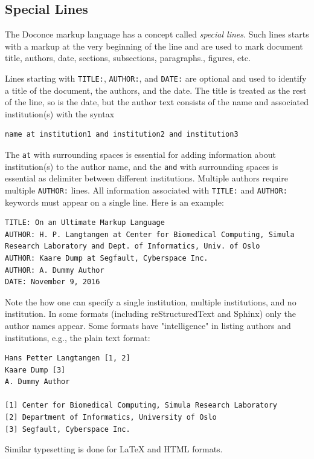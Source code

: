 \documentclass{article}
\begin{document}
\noindent

\subsection{Special Lines}

The Doconce markup language has a concept called \emph{special lines}.
Such lines starts with a markup at the very beginning of the
line and are used to mark document title, authors, date,
sections, subsections, paragraphs., figures, etc.

  

Lines starting with {\fontsize{10pt}{10pt}\verb!TITLE:!}, {\fontsize{10pt}{10pt}\verb!AUTHOR:!}, and {\fontsize{10pt}{10pt}\verb!DATE:!} are optional and used
to identify a title of the document, the authors, and the date. The
title is treated as the rest of the line, so is the date, but the
author text consists of the name and associated institution(s) with
the syntax 
\begin{Verbatim}[fontsize=\fontsize{9pt}{9pt},tabsize=8,baselinestretch=0.85,
fontfamily=tt,xleftmargin=7mm]
name at institution1 and institution2 and institution3
\end{Verbatim}
\noindent
The {\fontsize{10pt}{10pt}\verb!at!} with surrounding spaces
is essential for adding information about institution(s)
to the author name, and the {\fontsize{10pt}{10pt}\verb!and!} with surrounding spaces is
essential as delimiter between different institutions.
Multiple authors require multiple {\fontsize{10pt}{10pt}\verb!AUTHOR:!} lines. All information
associated with {\fontsize{10pt}{10pt}\verb!TITLE:!} and {\fontsize{10pt}{10pt}\verb!AUTHOR:!} keywords must appear on a single
line.  Here is an example:
\begin{Verbatim}[fontsize=\fontsize{9pt}{9pt},tabsize=8,baselinestretch=0.85,
fontfamily=tt,xleftmargin=7mm]
TITLE: On an Ultimate Markup Language
AUTHOR: H. P. Langtangen at Center for Biomedical Computing, Simula Research Laboratory and Dept. of Informatics, Univ. of Oslo
AUTHOR: Kaare Dump at Segfault, Cyberspace Inc.
AUTHOR: A. Dummy Author
DATE: November 9, 2016
\end{Verbatim}
\noindent
Note the how one can specify a single institution, multiple institutions,
and no institution. In some formats (including reStructuredText and Sphinx)
only the author names appear. Some formats have
"intelligence" in listing authors and institutions, e.g., the plain text
format:
\begin{Verbatim}[fontsize=\fontsize{9pt}{9pt},tabsize=8,baselinestretch=0.85,
fontfamily=tt,xleftmargin=7mm]
Hans Petter Langtangen [1, 2]
Kaare Dump [3]
A. Dummy Author 

[1] Center for Biomedical Computing, Simula Research Laboratory
[2] Department of Informatics, University of Oslo
[3] Segfault, Cyberspace Inc.
\end{Verbatim}
\noindent
Similar typesetting is done for {\LaTeX} and HTML formats.
\end{document}
